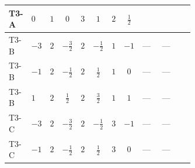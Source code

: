 \documentclass[8pt]{article}
\begin{document}
\begin{landscape}
\begin{longtable}{@{}llcccccc >{\raggedright\arraybackslash}p{0.21\linewidth} >{\raggedright\arraybackslash}p{0.21\linewidth} >{\raggedright\arraybackslash}p{0.21\linewidth}@{}}
\midrule
T3-A & $0$ & $1$ & $0$ & $3$ & $1$ & $2$ & $\frac{1}{2}$ & \scriptsize\adjustbox{max width=\linewidth}{$\begin{gathered} {\lambda_{S_2}^{(1)}} (4 T_{\nu}^{(2)}+14 {\lambda_{S_2}^{(A)}})\end{gathered}$} & \scriptsize\adjustbox{max width=\linewidth}{$\begin{gathered} +2 {\lambda_{S_2}^{(A)}} T_{\nu}^{(2)}\end{gathered}$} & \scriptsize\adjustbox{max width=\linewidth}{$\begin{gathered} -3 \operatorname{Tr}\!\left({y_2}\,\left({y_2}\right)^{\dagger}\,{y_2}\,\left({y_2}\right)^{\dagger}\right)\end{gathered}$} \\
\midrule
T3-B & $-3$ & $2$ & $-\frac{3}{2}$ & $2$ & $-\frac{1}{2}$ & $1$ & $-1$ & --- & --- & \scriptsize\adjustbox{max width=\linewidth}{$\begin{gathered} -4 \operatorname{Tr}\!\left({y_2}\,\left({y_2}\right)^{\dagger}\,{y_2}\,\left({y_2}\right)^{\dagger}\right)\end{gathered}$} \\
\midrule
T3-B & $-1$ & $2$ & $-\frac{1}{2}$ & $2$ & $\frac{1}{2}$ & $1$ & $0$ & --- & --- & \scriptsize\adjustbox{max width=\linewidth}{$\begin{gathered} -4 \operatorname{Tr}\!\left({y_2}\,\left({y_2}\right)^{\dagger}\,{y_2}\,\left({y_2}\right)^{\dagger}\right)\end{gathered}$} \\
\midrule
T3-B & $1$ & $2$ & $\frac{1}{2}$ & $2$ & $\frac{3}{2}$ & $1$ & $1$ & --- & --- & \scriptsize\adjustbox{max width=\linewidth}{$\begin{gathered} -4 \operatorname{Tr}\!\left({y_2}\,\left({y_2}\right)^{\dagger}\,{y_2}\,\left({y_2}\right)^{\dagger}\right)\end{gathered}$} \\
\midrule
T3-C & $-3$ & $2$ & $-\frac{3}{2}$ & $2$ & $-\frac{1}{2}$ & $3$ & $-1$ & --- & --- & \scriptsize\adjustbox{max width=\linewidth}{$\begin{gathered} -5 \operatorname{Tr}\!\left({y_2}\,\left({y_2}\right)^{\dagger}\,{y_2}\,\left({y_2}\right)^{\dagger}\right)\end{gathered}$} \\
\midrule
T3-C & $-1$ & $2$ & $-\frac{1}{2}$ & $2$ & $\frac{1}{2}$ & $3$ & $0$ & --- & --- & \scriptsize\adjustbox{max width=\linewidth}{$\begin{gathered} -5 \operatorname{Tr}\!\left({y_2}\,\left({y_2}\right)^{\dagger}\,{y_2}\,\left({y_2}\right)^{\dagger}\right)\end{gathered}$} \\

\end{longtable}
\end{landscape}
\end{document}

